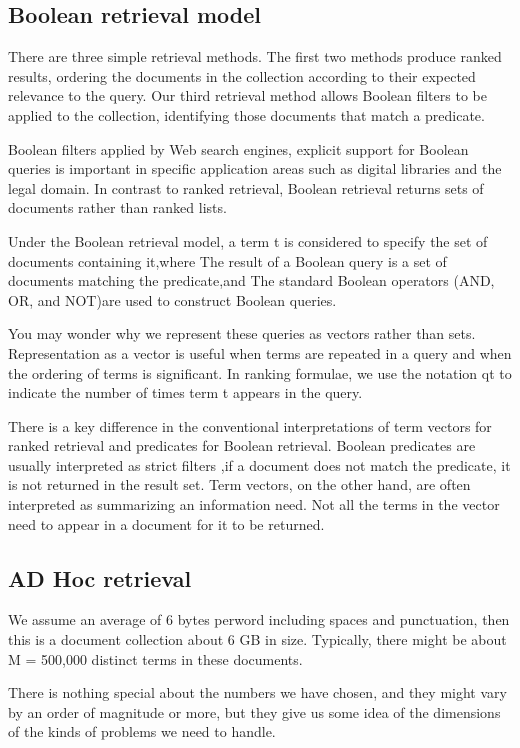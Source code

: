 \subsection{Boolean retrieval model}

There are three simple retrieval methods. The first two methods produce ranked results, ordering the documents in the collection according to their expected relevance to the query. Our third retrieval method allows Boolean filters to be applied to the collection, identifying those documents that match a predicate.
 
Boolean filters applied by Web search engines, explicit support for Boolean queries is important in specific application areas such as digital libraries and the legal domain. In contrast to ranked retrieval, Boolean retrieval returns sets of documents rather than ranked lists.

Under the Boolean retrieval model, a term t is considered to specify the set of documents containing it,where The result of a Boolean query is a set of documents matching the predicate,and The standard Boolean operators (AND, OR, and NOT)are used to construct Boolean queries.

You may wonder why we represent these queries as vectors rather than sets. Representation as a vector is useful when terms are repeated in a query and when the ordering of terms is significant. In ranking formulae, we use the notation qt to indicate the number of times term t appears in the query.

There is a key difference in the conventional interpretations of term vectors for ranked retrieval and predicates for Boolean retrieval. Boolean predicates are usually interpreted as strict filters ,if a document does not match the predicate, it is not returned in the result set. Term vectors, on the other hand, are often interpreted as summarizing an information need. Not all the terms in the vector need to appear in a document for it to be returned. 

\subsection{AD Hoc retrieval}

We assume an average of 6 bytes perword including spaces and punctuation,
then this is a document collection about 6 GB in size. Typically, there might
be about M = 500,000 distinct terms in these documents. 

There is nothing special about the numbers we have chosen, and they might vary by an order of magnitude or more, but they give us some idea of the dimensions of the
kinds of problems we need to handle. 

